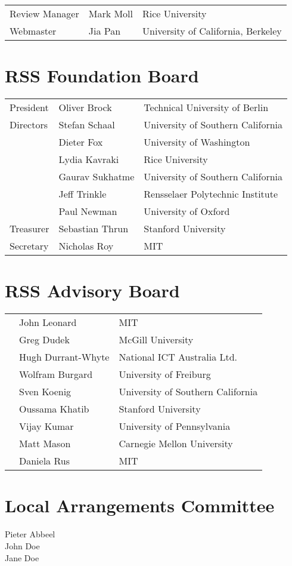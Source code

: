 \begin{tabular}{>{\raggedleft}p{5cm}p{4.5cm}>{\small}p{7cm}}
Review Manager & Mark Moll & Rice University\\
Webmaster &Jia Pan& University of California, Berkeley\\
\end{tabular}

\vspace{0.5cm}
\section{RSS Foundation Board}

\begin{tabular}{>{\raggedleft}p{5cm}p{4.5cm}>{\small}p{7cm}}
President & Oliver Brock & Technical University of Berlin\\
Directors & Stefan Schaal & University of Southern California\\
& Dieter Fox & University of Washington\\
& Lydia Kavraki & Rice University \\
& Gaurav Sukhatme & University of Southern California \\
& Jeff Trinkle & Rensselaer Polytechnic Institute \\
& Paul Newman & University of Oxford \\
Treasurer & Sebastian Thrun & Stanford University\\
Secretary & Nicholas Roy & MIT\\
\end{tabular}

\vspace{0.5cm}
\section{RSS Advisory Board}

\begin{tabular}{>{\raggedleft}p{5cm}p{4.5cm}>{\small}p{7cm}}
& John Leonard & MIT\\
& Greg Dudek & McGill University \\
&Hugh Durrant-Whyte &National ICT Australia Ltd.\\
&Wolfram Burgard &University of Freiburg\\
&Sven Koenig&University of Southern California\\
&Oussama Khatib&Stanford University\\
&Vijay Kumar&University of Pennsylvania\\
&Matt Mason&Carnegie Mellon University\\
&Daniela Rus&MIT\\
\end{tabular}

\vspace{0.9cm}
\section{Local Arrangements Committee}

\begin{multicols}{4}

{
\noindent
Pieter Abbeel\\
John Doe\\
Jane Doe\\
}
\end{multicols}
\vfill

